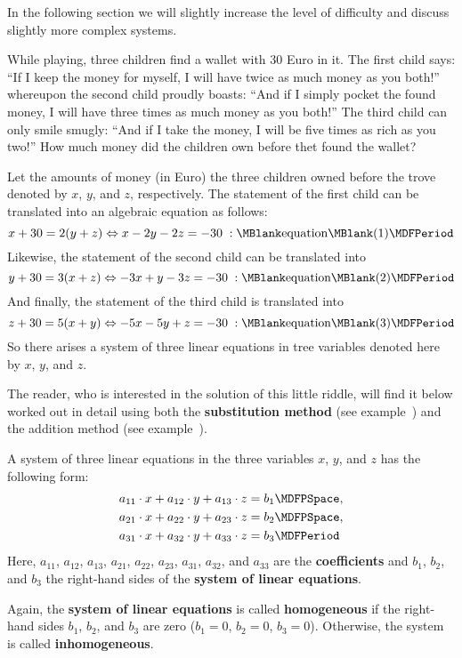 \begin{MIntro}
In the following section we will slightly increase the level of difficulty and 
discuss slightly more complex systems.

\begin{MExample}
While playing, three children find a wallet with $30$ Euro in it. The first child says: 
``If I keep the money for myself, I will have twice as much money as you both!''  whereupon the 
second child proudly boasts: ``And if I simply pocket the found money, I will have three 
times as much money as you both!'' The third child can only smile smugly: ``And if I take the 
money, I will be five times as rich as you two!'' How much money did the children
own before thet found the wallet?

Let the amounts of money (in Euro) the three children owned before the trove denoted by 
$x$, $y$, and $z$, respectively. The statement of the first child can be translated into
an algebraic equation as follows:
$$x + 30 = 2 (y + z) \Leftrightarrow x - 2 y - 2 z = - 30 \; : \MBlank\mbox{equation}\MBlank (1) \MDFPeriod$$
Likewise, the statement of the second child can be translated into
$$y + 30 = 3 (x + z) \Leftrightarrow - 3 x + y - 3 z = - 30 \; : \MBlank\mbox{equation}\MBlank (2) \MDFPeriod$$
And finally, the statement of the third child is translated into
$$z + 30 = 5 (x + y) \Leftrightarrow - 5 x - 5 y + z = - 30 \; : \MBlank\mbox{equation}\MBlank (3) \MDFPeriod$$
So there arises a system of three linear equations in tree variables denoted here by $x$, $y$, and $z$. 
\end{MExample}
The reader, who is interested in the solution of this little riddle, will find it below 
worked out in detail using both the \textbf{substitution method} 
(see example~) and the addition method (see example~).
\begin{MInfo}
A system of three linear equations in the three variables $x$, $y$, and $z$ has
the following form:
\begin{eqnarray*}
a_{11} \cdot x + a_{12} \cdot y + a_{13} \cdot z & = b_1 \MDFPSpace, \\
a_{21} \cdot x + a_{22} \cdot y + a_{23} \cdot z & = b_2 \MDFPSpace, \\
a_{31} \cdot x + a_{32} \cdot y + a_{33} \cdot z & = b_3 \MDFPeriod
\end{eqnarray*}
Here, $a_{11}$, $a_{12}$, $a_{13}$, $a_{21}$, $a_{22}$, $a_{23}$, $a_{31}$, $a_{32}$, and $a_{33}$
are the \textbf{coefficients} and $b_1$, $b_2$, and $b_3$ the right-hand sides
of the \textbf{system of linear equations}.

Again, the \textbf{system of linear equations} is called \textbf{homogeneous} if 
the right-hand sides $b_1$, $b_2$, and $b_3$ are zero ($b_1 = 0$, $b_2 = 0$, $b_3 = 0$). 
Otherwise, the system is called \textbf{inhomogeneous}.
\end{MInfo}
\end{MIntro}

